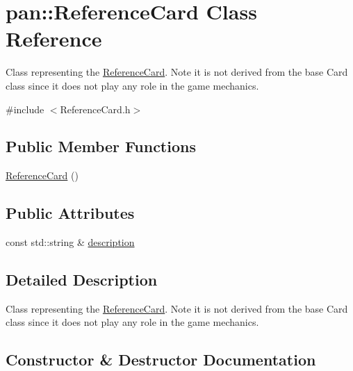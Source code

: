 \hypertarget{classpan_1_1_reference_card}{}\section{pan\+:\+:Reference\+Card Class Reference}
\label{classpan_1_1_reference_card}


Class representing the \hyperlink{classpan_1_1_reference_card}{Reference\+Card}. Note it is not derived from the base Card class since it does not play any role in the game mechanics.  




{\ttfamily \#include $<$Reference\+Card.\+h$>$}

\subsection*{Public Member Functions}
\begin{DoxyCompactItemize}
\item 
\hyperlink{classpan_1_1_reference_card_a6bd8313b5bca442cd17e32c2bf3ca9fc}{Reference\+Card} ()
\end{DoxyCompactItemize}
\subsection*{Public Attributes}
\begin{DoxyCompactItemize}
\item 
const std\+::string \& \hyperlink{classpan_1_1_reference_card_a770a4188e98004fab2b13218f29bde26}{description}
\end{DoxyCompactItemize}


\subsection{Detailed Description}
Class representing the \hyperlink{classpan_1_1_reference_card}{Reference\+Card}. Note it is not derived from the base Card class since it does not play any role in the game mechanics. 

\subsection{Constructor \& Destructor Documentation}
\mbox{\label{classpan_1_1_reference_card_a6bd8313b5bca442cd17e32c2bf3ca9fc}} 
